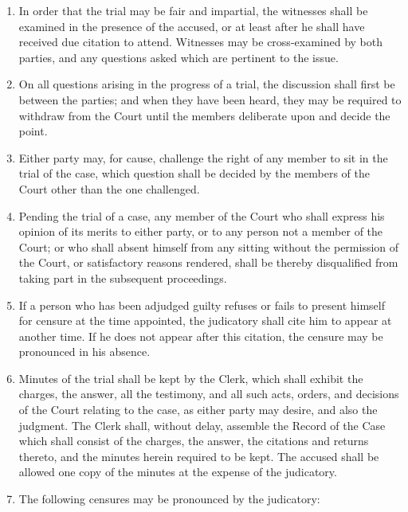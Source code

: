 \documentclass[
]{book}
\begin{document}
\begin{enumerate}
\item
  In order that the trial may be fair and impartial, the witnesses shall be examined in the presence of the accused, or at least after he shall have received due citation to attend. Witnesses may be cross-examined by both parties, and any questions asked which are pertinent to the issue.
\item
  On all questions arising in the progress of a trial, the discussion shall first be between the parties; and when they have been heard, they may be required to withdraw from the Court until the members deliberate upon and decide the point.
\item
  Either party may, for cause, challenge the right of any member to sit in the trial of the case, which question shall be decided by the members of the Court other than the one challenged.
\item
  Pending the trial of a case, any member of the Court who shall express his opinion of its merits to either party, or to any person not a member of the Court; or who shall absent himself from any sitting without the permission of the Court, or satisfactory reasons rendered, shall be thereby disqualified from taking part in the subsequent proceedings.
\item
  If a person who has been adjudged guilty refuses or fails to present himself for censure at the time appointed, the judicatory shall cite him to appear at another time. If he does not appear after this citation, the censure may be pronounced in his absence.
\item
  Minutes of the trial shall be kept by the Clerk, which shall exhibit the charges, the answer, all the testimony, and all such acts, orders, and decisions of the Court relating to the case, as either party may desire, and also the judgment. The Clerk shall, without delay, assemble the Record of the Case which shall consist of the charges, the answer, the citations and returns thereto, and the minutes herein required to be kept. The accused shall be allowed one copy of the minutes at the expense of the judicatory.
\item
  The following censures may be pronounced by the judicatory:
\end{enumerate}
\end{document}
